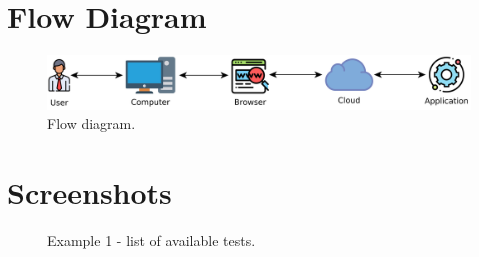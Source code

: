 \documentclass[11pt,a4paper]{article}
\begin{document}
\section{Flow Diagram}

\begin{figure}[H]
    \centering
    \includegraphics[scale=0.07]{diag/flow.pdf}
    \caption{Flow diagram.}
    \label{fig:flow}
\end{figure}

\section{Screenshots}

\begin{figure}[H]
    \centering
    \caption{Example 1 - list of available tests.}
    \label{fig:example1}
\end{figure}
\end{document}
